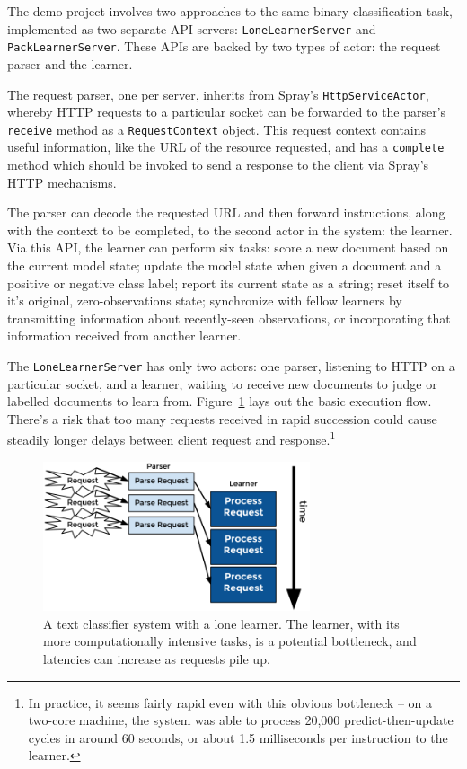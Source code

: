 \documentclass{article}
\begin{document}
The demo project involves two approaches to the same binary classification task,
implemented as two separate API servers: \texttt{LoneLearnerServer} and
\texttt{PackLearnerServer}. These APIs are backed by two types of actor: the request
parser and the learner. 

The request parser, one per server, inherits from Spray's \texttt{HttpServiceActor},
whereby HTTP requests to a particular socket can be forwarded to the parser's
\texttt{receive} method as a \texttt{RequestContext} object. This request context
contains useful information, like the URL of the resource requested, and has a
\texttt{complete} method which should be invoked to send a response to the
client via Spray's HTTP mechanisms.

The parser can decode the requested URL and then forward instructions, along with
the context to be completed, to the second actor in the system: the learner. Via this 
API, the learner can perform six tasks: score a new document based on the current 
model state; update the model state when given a document and a positive or negative 
class label; report its current state as a string; reset itself to it's original, 
zero-observations state; synchronize with fellow learners by transmitting information
about recently-seen observations, or incorporating that information received from another
learner.

The \texttt{LoneLearnerServer} has only two actors: one parser, listening to HTTP on
a particular socket, and a learner, waiting to receive new documents to judge or labelled
documents to learn from. Figure~\ref{fig_txt_cls_sng} lays out the basic execution flow.
There's a risk that too many requests received in rapid succession could cause steadily
longer delays between client request and response.\footnote{In practice, it seems
fairly rapid even with this obvious bottleneck -- on a two-core machine, the system was
able to process 20,000 predict-then-update cycles in around 60 seconds, or about 
1.5 milliseconds per instruction to the learner.}

\begin{figure}[h]
\includegraphics[width=0.7\textwidth]{fig/tex/single_txt_cls.png}
\centering
\caption{A text classifier system with a lone learner. The learner, with its more
computationally intensive tasks, is a potential bottleneck, and latencies can increase as
requests pile up.}
\label{fig_txt_cls_sng}
\end{figure}
\end{document}
